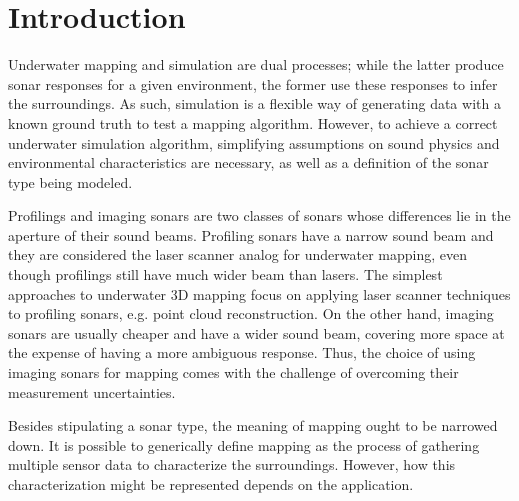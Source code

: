 \chapter{Introduction}


Underwater mapping and simulation are dual processes; while the latter produce
sonar responses for a given environment, the former use these responses to infer
the surroundings. As such, simulation is a flexible way of generating data with
a known ground truth to test a mapping algorithm. However, to achieve a correct
underwater simulation algorithm, simplifying assumptions on sound physics
and environmental characteristics are necessary, as well as a definition of the
sonar type being modeled.

Profilings and imaging sonars are two classes of sonars whose differences lie
in the aperture of their sound beams. Profiling sonars have a narrow sound beam
and they are considered the laser scanner analog for underwater mapping,
even though profilings still have much wider beam than lasers. The simplest
approaches to underwater 3D mapping focus on
applying laser scanner techniques to profiling sonars, e.g. point cloud reconstruction.
 On the other hand, imaging sonars are usually
cheaper and have a wider sound beam, covering more space at the expense of
having a more ambiguous response. Thus, the choice of using imaging
sonars for mapping comes with the challenge of overcoming their measurement
uncertainties.



Besides stipulating a sonar type, the meaning of mapping ought to be narrowed
down. It is possible to generically define mapping as the process of gathering
multiple sensor data to characterize the surroundings. However, how this
characterization might be represented depends on the application.

